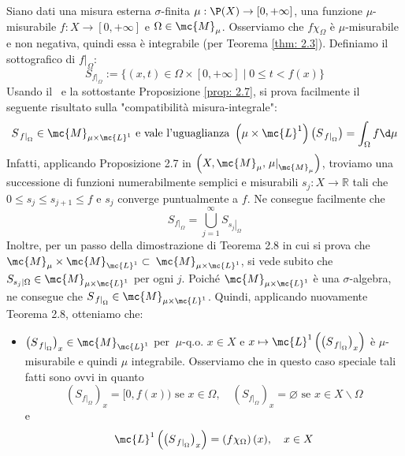 \begin{oss}
    Siano dati una misura esterna $\sigma$-finita $\mu: \P(X) \rightarrow[0,+\infty]$, una funzione $\mu$-misurabile $f: X \rightarrow[0,+\infty]$ e $\Omega \in \mc{M}_{\mu}$. Osserviamo che $f \chi_{\Omega}$ è $\mu$-misurabile e non negativa, quindi essa è integrabile (per Teorema \ref{thm: 2.3}). Definiamo il sottografico di $\left.f\right|_{\Omega}$:
    \begin{equation}\label{eq: 2.4.1}
        S_{\left.f\right|_{\Omega}}:=\{(x, t) \in \Omega \times[0,+\infty] \mid 0 \leq t<f(x)\}
    \end{equation}
    Usando il \lemmone\ e la sottostante Proposizione \ref{prop: 2.7}, si prova facilmente il seguente risultato sulla "compatibilità misura-integrale":
    \[S_{\left.f\right|_{\Omega}} \in \mc{M}_{\mu \times \mc{L}^{1}} \text { e vale l'uguaglianza }\left(\mu \times \mc{L}^{1}\right)\left(S_{\left.f\right|_{\Omega}}\right)=\int_{\Omega} f \d \mu\]
    Infatti, applicando Proposizione 2.7 in $\left(X, \mc{M}_{\mu},\left.\mu\right|_{\mc{M}_{\mu}}\right)$, troviamo una successione di funzioni numerabilmente semplici e misurabili $s_{j}: X \rightarrow \mathbb{R}$ tali che $0 \leq s_{j} \leq s_{j+1} \leq f$ e $s_{j}$ converge puntualmente a $f$. Ne consegue facilmente che
    \[
        S_{\left.f\right|_{\Omega}}=\bigcup_{j=1}^{\infty} S_{\left.s_{j}\right|_{\Omega}}
    \]
    Inoltre, per un passo della dimostrazione di Teorema 2.8 in cui si prova che $\mc{M}_{\mu} \times \mc{M}_{\mc{L}^{1}} \subset$ $\mc{M}_{\mu \times \mc{L}^{1}}$, si vede subito che $S_{s_{j} \mid \Omega} \in \mc{M}_{\mu \times \mc{L}^{1}}$ per ogni $j$. Poiché $\mc{M}_{\mu \times \mc{L}^{1}}$ è una $\sigma$-algebra, ne consegue che $S_{\left.f\right|_{\Omega}} \in \mc{M}_{\mu \times \mc{L}^{1}}$. Quindi, applicando nuovamente Teorema 2.8, otteniamo che:
    \begin{itemize}
        \item $\left(S_{\left.f\right|_{\Omega}}\right)_{x} \in \mc{M}_{\mc{L}^{1}}$ per $\ \mu$-q.o. $x \in X$ e $x \mapsto \mc{L}^{1}\left(\left(S_{\left.f\right|_{\Omega}}\right)_{x}\right)$ è $\mu$-misurabile e quindi $\mu$ integrabile. Osserviamo che in questo caso speciale tali fatti sono ovvi in quanto
        \[ \left(S_{\left.f\right|_{\Omega}}\right)_{x}=[0, f(x)) \text { se } x \in \Omega, \quad\left(S_{\left.f\right|_{\Omega}}\right)_{x}=\varnothing \text { se } x \in X \backslash \Omega\]
        e
        \[\mc{L}^{1}\left(\left(S_{\left.f\right|_{\Omega}}\right)_{x}\right)=\left(f \chi_{\Omega}\right)(x), \quad x \in X\]

\end{itemize}
\end{oss}
